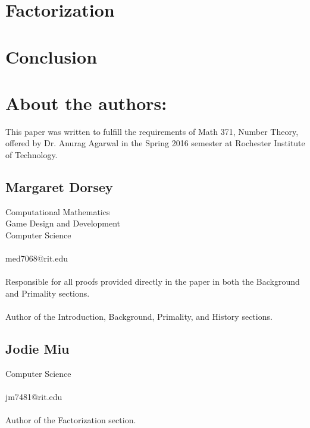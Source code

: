 \documentclass{article}
\begin{document}
\section{Factorization}\label{Factorization}

\section{Conclusion}\label{Conclusion}

\newpage

\nocite{*}
         






\section*{About the authors:}


\par This paper was written to fulfill the requirements of Math 371, Number Theory, offered by Dr. Anurag Agarwal
in the Spring 2016 semester at Rochester Institute of Technology.
\subsection*{Margaret Dorsey}
   Computational Mathematics
   \\Game Design and Development
   \\Computer Science
   \\
   \\ med7068@rit.edu
  \\
  \\ Responsible for all proofs provided directly in the paper in both the Background and Primality sections.
  \\
  \\ Author of the Introduction, Background, Primality, and History sections.

\subsection*{Jodie Miu}
   Computer Science
   \\
   \\ jm7481@rit.edu 
   \\
   \\ Author of the Factorization section.
   
\end{document}
